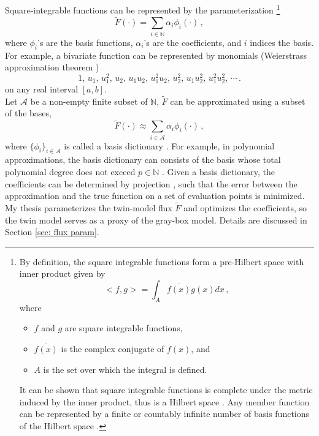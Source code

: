 Square-integrable functions
can be represented by the parameterization
\footnote{
    By definition, the square 
    integrable functions form a pre-Hilbert space with inner product given by
    $$<f,g> = \int_A \overline{f(x)}g(x) dx\,,$$ where 
    \begin{itemize}
        \item $f$ and $g$ are square integrable functions,
        \item $\overline{f(x)}$ is the complex conjugate of $f(x)$, and
        \item $A$ is the set over which the integral is defined.
    \end{itemize}
    It can be shown that square integrable functions is complete 
    under the metric induced by the inner product, thus is a Hilbert space \cite{functional analysis}.
    Any member function can be represented by 
    a finite or countably infinite number of basis functions of the Hilbert space
    \cite{functional analysis}.
} \cite{functional analysis}
\begin{equation}
    \tilde{F}(\cdot) = \sum_{i\in \mathbb{N}} {\alpha_i} \phi_i(\cdot)\,,
    \label{eqn: linear param general}
\end{equation}
where $\phi_i$'s are the basis functions, $\alpha_i$'s are the coefficients, and $i$
indices the basis. For example, 
a bivariate function can be represented by monomials (Weierstrass approximation 
theorem \cite{functional analysis})
\begin{equation*}
    1,\,  u_1,\, u_1^2,\,
    u_2,\, u_1 u_2,\,  u_1^2 u_2, \,
    u_2^2,\,  u_1 u_2^2,\,  u_1^2 u_2^2,\, \cdots\,.
\end{equation*}
on any real interval $[a,b]$.\\

Let $\mathcal{A}$ be a non-empty finite subset of $\mathbb{N}$,
$\tilde{F}$ can be approximated using a subset of the bases, 
\begin{equation}
    \tilde{F}(\cdot) \approx \sum_{i\in \mathcal{A}} {\alpha_i} \phi_i(\cdot)\,,
    \label{eqn: linear param truncate}
\end{equation}
where $\{\phi_i\}_{i\in \mathcal{A}}$ is called a basis dictionary \cite{match pursuit}. 
For example, in polynomial approximations, the basis dictionary can consists of
the basis whose total polynomial degree does not exceed $p\in \mathbb{N}$ \cite{PCE}.
Given a basis dictionary, the coefficients can be determined by projection \cite{PCE}, 
such that the error between the approximation
and the true function on a set of evaluation points 
is minimized. My thesis parameterizes the twin-model flux $\tilde{F}$ and
optimizes the coefficients,
so the twin model serves as a proxy of the gray-box model. Details are discussed in 
Section \ref{sec: flux param}.\\

